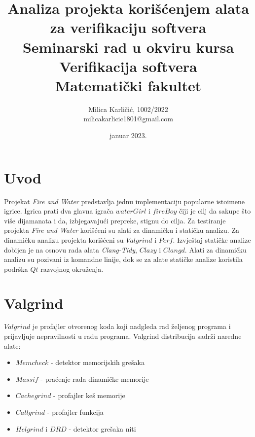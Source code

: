 \documentclass[a4paper]{article}
\begin{document}
	
	\title{Analiza projekta korišćenjem alata za verifikaciju softvera\\ \small{Seminarski rad u okviru kursa\\Verifikacija softvera\\ Matematički fakultet}}
	
	\author{Milica Karličić, 1002/2022\\ milicakarlicic1801@gmail.com}
	\date{januar 2023.}
	\maketitle
	
	
	\tableofcontents
	
	\newpage
	
	\section{Uvod}
	\label{sec:uvod}
	Projekat \textit{Fire and Water} predstavlja jednu implementaciju popularne istoimene igrice. Igrica prati dva glavna igrača $waterGirl$ i $fireBoy$ čiji je cilj da sakupe što više dijamanata i da, izbjegavajući prepreke, stignu do cilja. Za testiranje projekta \textit{Fire and Water} korišćeni su alati za dinamičku i statičku analizu. Za dinamičku analizu projekta korišćeni su $Valgrind$ i $Perf$. Izvještaj statičke analize dobijen je na osnovu rada alata \textit{Clang-Tidy}, $Clazy$ i $Clangd$. Alati za dinamičku analizu su pozivani iz komandne linije, dok se za alate statičke analize koristila podrška $Qt$ razvojnog okruženja.
	
	\section{Valgrind}
	$Valgrind$ je profajler otvorenog koda koji nadgleda rad željenog programa i prijavljuje nepravilnosti u radu programa. Valgrind distribucija sadrži naredne alate:
	\begin{itemize}
		\item $Memcheck$ - detektor memorijskih grešaka
		\item $Massif$ - praćenje rada dinamičke memorije
		\item $Cachegrind$ - profajler keš memorije
		\item $Callgrind$ - profajler funkcija
		\item $Helgrind$ i $DRD$ - detektor grešaka niti
	\end{itemize} \cite{verifikacija1}
	
\end{document}
